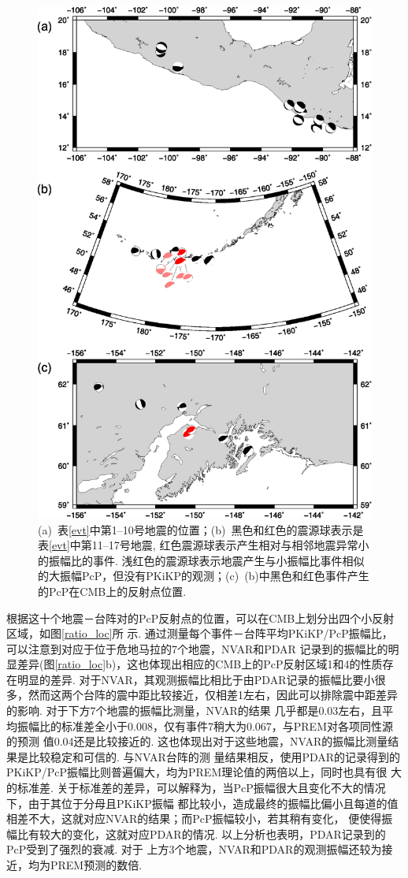 \begin{figure}
\centering
\includegraphics[width=0.7\linewidth]{fig/chap3/evt_bp.eps}
\caption{(a)~表\ref{evt}中第1--10号地震的位置；(b)~黑色和红色的震源球表示是表\ref{evt}中第11--17号地震, 红色震源球表示产生相对与相邻地震异常小的振幅比的事件. 浅红色的震源球表示地震产生与小振幅比事件相似的大振幅PcP，但没有PKiKP的观测；(c)~(b)中黑色和红色事件产生的PcP在CMB上的反射点位置. }
\label{map}
\end{figure}

根据这十个地震－台阵对的PcP反射点的位置，可以在CMB上划分出四个小反射区域，如图\ref{ratio_loc}所
示. 通过测量每个事件－台阵平均PKiKP/PcP振幅比，可以注意到对应于位于危地马拉的7个地震，NVAR和PDAR
记录到的振幅比的明显差异(图\ref{ratio_loc}b)，这也体现出相应的CMB上的PcP反射区域1和4的性质存
在明显的差异. 对于NVAR，其观测振幅比相比于由PDAR记录的振幅比要小很多，然而这两个台阵的震中距比较接近，仅相差1{\textdegree}左右，因此可以排除震中距差异的影响. 对于下方7个地震的振幅比测量，NVAR的结果
几乎都是0.03左右，且平均振幅比的标准差全小于0.008，仅有事件7稍大为0.067，与PREM对各项同性源的预测
值0.04还是比较接近的. 这也体现出对于这些地震，NVAR的振幅比测量结果是比较稳定和可信的. 与NVAR台阵的测
量结果相反，使用PDAR的记录得到的PKiKP/PcP振幅比则普遍偏大，均为PREM理论值的两倍以上，同时也具有很
大的标准差. 关于标准差的差异，可以解释为，当PcP振幅很大且变化不大的情况下，由于其位于分母且PKiKP振幅
都比较小，造成最终的振幅比偏小且每道的值相差不大，这就对应NVAR的结果；而PcP振幅较小，若其稍有变化，
便使得振幅比有较大的变化，这就对应PDAR的情况. 以上分析也表明，PDAR记录到的PcP受到了强烈的衰减. 对于
上方3个地震，NVAR和PDAR的观测振幅还较为接近，均为PREM预测的数倍. 

